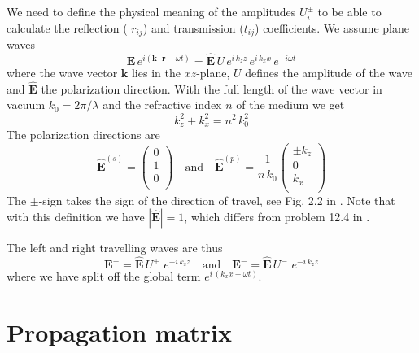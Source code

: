 We need to define the physical meaning of the amplitudes $U_i^\pm$ to be able to calculate the reflection ( $r_{ij}$) and transmission ($t_{ij}$) coefficients. We assume plane waves 
\begin{equation}
\mathbf{E} \, e^{i (\mathbf{k}  \cdot \mathbf{r} - \omega t)}
=
\mathbf{\hat{E}} \, U \, e^{i \, k_z z} \, e^{i \, k_x x} \, e^{-i \omega t}
\end{equation}
where the wave vector $\mathbf{k} $ lies in the $xz$-plane, $U$ defines the amplitude of the wave and $\mathbf{\hat{E}} $  the polarization direction.
With   the full length of the wave vector in vacuum $k_0 = 2 \pi / \lambda$ and the refractive index $n$ of the medium we get
\begin{equation}
k_{z}^2 + k_{x}^2  = n^2 \, k_0^2 
\end{equation}
The polarization directions are
\begin{equation}
\mathbf{\hat{E}}^{(s)} = \begin{pmatrix}
 0 \\ 1 \\ 0 \\
\end{pmatrix}
\quad 
\text{and}
\quad
\mathbf{\hat{E}}^{(p)} =\frac{1}{n \, k_0} \begin{pmatrix}
\pm k_z \\ 0 \\  k_x  \\
\end{pmatrix}
\end{equation}
The $\pm$-sign takes the sign of the direction of travel, see Fig. 2.2 in \cite{Novotny-Hecht2012}. Note that with this definition we have $|\mathbf{\hat{E}}| = 1$, which differs from problem 12.4 in \cite{Novotny-Hecht2012}.

The left and right travelling waves are thus
\begin{equation}
\mathbf{E}^+ = \mathbf{\hat{E}} \, U^+ \, \, e^{+ i \, k_z z}
\quad
\text{and}
\quad
\mathbf{E}^- = \mathbf{\hat{E}} \, U^- \, \, e^{- i \, k_z z}
\end{equation}
where we have split off the global term $ e^{i \, ( k_x x - \omega t)}$.

\section{Propagation matrix}

